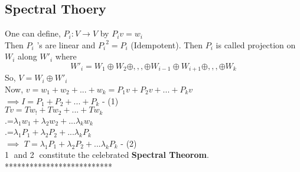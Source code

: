 \documentclass[12pt]{article}
\theoremstyle{definition}
\begin{document}
	 \subsection{Spectral Thoery}
	 One can define, $P_i:V\to V$ by $P_iv = w_i$\\
	 Then $P_i$ 's are linear and ${P_i}^2 = P_i$ (Idempotent). Then $P_i$ is called projection on $W_i$ along ${W\prime}_i$ where $${W\prime}_i= W_1\oplus W_2\oplus,,,\oplus W_{i-1}\oplus W_{i+1}\oplus,,,\oplus W_k$$
	 So, \space $V = W_i\oplus {W\prime}_i$\\
	 Now, $v=w_1+w_2+...+w_k = P_1 v+P_2 v+...+P_k v$\\
	 $\implies \boxed{I = P_1+P_2+...+P_k}$ - (1)
	 \\
	 $Tv = Tw_!+Tw_2+...+Tw_k$\\
	 .\hspace{0.5cm}=$\lambda_{1}w_1+\lambda_{2}w_2+...\lambda_{k}w_k$\\
	 .\hspace{0.5cm}=$\lambda_{1}P_1+\lambda_{2}P_2+...\lambda_{k}P_k$\\
	 $\implies$
	 $\boxed{T= \lambda_{1}P_1+\lambda_{2}P_2+...\lambda_{k}P_k}$ - (2)\\
	 \textcircled{1} and \textcircled{2} constitute the celebrated \textbf{Spectral Theorom}.
	 \\
	  					**************************
	  
\end{document}
